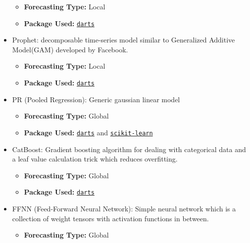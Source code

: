 \documentclass{article}
\begin{document}
\begin{itemize}
\begin{itemize}
        \item \textbf{Forecasting Type: }Local
        \item \textbf{Package Used: }\texttt{\href{https://unit8co.github.io/darts/generated_api/darts.models.forecasting.theta.html\#darts.models.forecasting.theta.Theta}{darts}}
    \end{itemize}
    \item Prophet: decomposable time-series model similar to Generalized Additive Model(GAM) developed by Facebook\cite{Taylor2018}.
    \begin{itemize}
        \item \textbf{Forecasting Type: }Local
        \item \textbf{Package Used: }\texttt{\href{https://unit8co.github.io/darts/generated_api/darts.models.forecasting.prophet_model.html}{darts}}
    \end{itemize}
    \item PR (Pooled Regression): Generic gaussian linear model\cite{Trapero2015}
    \begin{itemize}
        \item \textbf{Forecasting Type: }Global
        \item \textbf{Package Used: }\texttt{\href{https://unit8co.github.io/darts/generated_api/darts.models.forecasting.sklearn_model.html\#darts.models.forecasting.sklearn_model.SKLearnModel}{darts}} and \texttt{\href{https://scikit-learn.org/stable/modules/generated/sklearn.linear_model.TweedieRegressor.html\#sklearn.linear_model.TweedieRegressor}{scikit-learn}}
    \end{itemize}
    \item CatBoost: Gradient boosting algorithm for dealing with categorical data and a leaf value calculation trick which reduces overfitting\cite{Prokhorenkova}.
    \begin{itemize}
        \item \textbf{Forecasting Type: }Global
        \item \textbf{Package Used: }\texttt{\href{https://unit8co.github.io/darts/generated_api/darts.models.forecasting.catboost_model.html}{darts}}
    \end{itemize}
    \item FFNN (Feed-Forward Neural Network): Simple neural network which is a collection of weight tensors with activation functions in between\cite{Goodfellow2016}.
    \begin{itemize}
        \item \textbf{Forecasting Type: }Global

\end{itemize}
\end{itemize}
\end{document}
